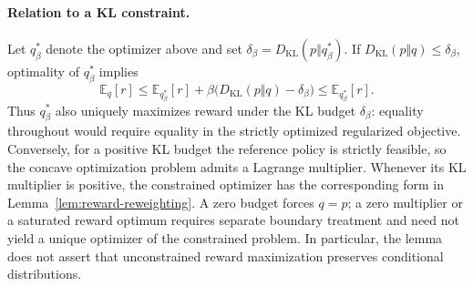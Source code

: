 \paragraph{Relation to a KL constraint.}
Let $q_\beta^*$ denote the optimizer above and set
$\delta_\beta=D_{\mathrm{KL}}(p\Vert q_\beta^*)$.
If $D_{\mathrm{KL}}(p\Vert q)\le\delta_\beta$,
optimality of $q_\beta^*$ implies
\begin{equation}
 \mathbb E_q[r]
 \le\mathbb E_{q_\beta^*}[r]
       +\beta\bigl(D_{\mathrm{KL}}(p\Vert q)-\delta_\beta\bigr)
 \le\mathbb E_{q_\beta^*}[r].
 \label{eq:app-reward-constrained}
\end{equation}
Thus $q_\beta^*$ also uniquely maximizes reward under the KL budget
$\delta_\beta$: equality throughout would require equality in the
strictly optimized regularized objective.
Conversely, for a positive KL budget the reference policy is strictly
feasible, so the concave optimization problem admits a Lagrange multiplier.
Whenever its KL multiplier is positive, the constrained optimizer has
the corresponding form in Lemma~\ref{lem:reward-reweighting}.
A zero budget forces $q=p$; a zero multiplier or a saturated reward
optimum requires separate boundary treatment and need not yield a unique
optimizer of the constrained problem. In particular, the lemma does not
assert that unconstrained reward maximization preserves conditional
distributions.
